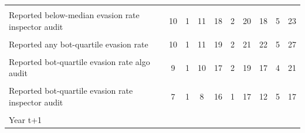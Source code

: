 {\begin{tabular}{l*{9}{c}}
            &                     &                     &                     &                     &                     &                     &                     &                     &                     \\
Reported below-median evasion rate  inspector audit&          10         &           1         &          11         &          18         &           2         &          20         &          18         &           5         &          23         \\
            &                     &                     &                     &                     &                     &                     &                     &                     &                     \\
Reported any bot-quartile evasion rate&          10         &           1         &          11         &          19         &           2         &          21         &          22         &           5         &          27         \\
            &                     &                     &                     &                     &                     &                     &                     &                     &                     \\
Reported bot-quartile  evasion rate algo audit&           9         &           1         &          10         &          17         &           2         &          19         &          17         &           4         &          21         \\
            &                     &                     &                     &                     &                     &                     &                     &                     &                     \\
Reported bot-quartile  evasion rate  inspector audit&           7         &           1         &           8         &          16         &           1         &          17         &          12         &           5         &          17         \\
            &                     &                     &                     &                     &                     &                     &                     &                     &                     \\
Year t+1    &                     &                     &                     &                     &                     &                     &                     &                     &                     \\

\end{tabular}}
